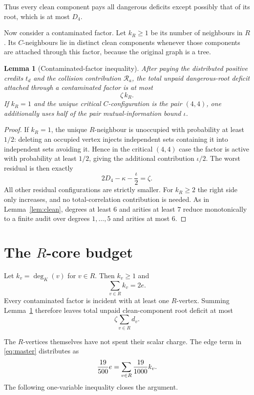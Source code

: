 \documentclass[11pt]{article}
\newtheorem{lemma}[theorem]{Lemma}
\begin{document}
Thus every clean component pays all dangerous deficits except possibly that of its root, which is at most $D_4$.

Now consider a contaminated factor.  Let $k_R\ge1$ be its number of neighbours in $R$.  Its $C$-neighbours lie in distinct clean components whenever those components are attached through this factor, because the original graph is a tree.

\begin{lemma}[Contaminated-factor inequality]\label{lem:contam}
After paying the distributed positive credits $t_d$ and the collision contribution $\mathcal R_a$, the total unpaid dangerous-root deficit attached through a contaminated factor is at most
\[
 \zeta\,k_R.
\]
If $k_R=1$ and the unique critical $C$-configuration is the pair $(4,4)$, one additionally uses half of the pair mutual-information bound $\iota$.
\end{lemma}

\begin{proof}
If $k_R=1$, the unique $R$-neighbour is unoccupied with probability at least $1/2$: deleting an occupied vertex injects independent sets containing it into independent sets avoiding it.  Hence in the critical $(4,4)$ case the factor is active with probability at least $1/2$, giving the additional contribution $\iota/2$.
The worst residual is then exactly
\[
 2D_4-\kappa-\frac\iota2=\zeta.
\]
All other residual configurations are strictly smaller.  For $k_R\ge2$ the right side only increases, and no total-correlation contribution is needed.  As in Lemma~\ref{lem:clean}, degrees at least $6$ and arities at least $7$ reduce monotonically to a finite audit over degrees $1,\ldots,5$ and arities at most $6$.
\end{proof}

\section{The $R$-core budget}

Let $k_v=\deg_K(v)$ for $v\in R$.  Then $k_v\ge1$ and
\[
 \sum_{v\in R}k_v=2e.
\]
Every contaminated factor is incident with at least one $R$-vertex.  Summing Lemma~\ref{lem:contam} therefore leaves total unpaid clean-component root deficit at most
\begin{equation}\label{eq:residualR}
 \zeta\sum_{v\in R}d_v.
\end{equation}

The $R$-vertices themselves have not spent their scalar charge.  The edge term in \eqref{eq:master} distributes as
\[
 {19\over500}e
 =\sum_{v\in R}{19\over1000}k_v.
\]
The following one-variable inequality closes the argument.
\end{document}
